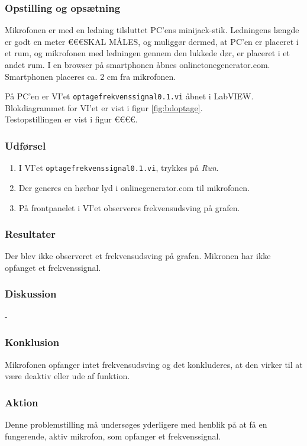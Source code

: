 		\subsubsection{Opstilling og opsætning}
		Mikrofonen er med en ledning tilsluttet PC'ens minijack-stik. Ledningens længde er godt en meter €€€SKAL MÅLES, og muliggør dermed, at PC'en er placeret i et rum, og mikrofonen med ledningen gennem den lukkede dør, er placeret i et andet rum. I en browser på smartphonen åbnes onlinetonegenerator.com. Smartphonen placeres ca. 2 cm fra mikrofonen. 
	
			På PC'en er VI'et \texttt{optagefrekvenssignal0.1.vi} åbnet i LabVIEW. Blokdiagrammet for VI'et er vist i figur \ref{fig:bdoptage}.   \\   
			
			Testopstillingen er vist i figur €€€€.\\ 
	
		\subsubsection{Udførsel}
			\begin{enumerate}
				\item I VI'et \texttt{optagefrekvenssignal0.1.vi}, trykkes på \textit{Run}.  
				\item Der generes en hørbar lyd i onlinegenerator.com til mikrofonen. 
				\item På frontpanelet i VI'et observeres frekvensudsving på grafen.  
			\end{enumerate}
		
		\subsubsection{Resultater}
		Der blev ikke observeret et frekvensudsving på grafen. Mikronen har ikke opfanget et frekvenssignal. 
		\subsubsection{Diskussion} 
		-
		\subsubsection{Konklusion}
		Mikrofonen opfanger intet frekvensudsving og det konkluderes, at den virker til at være deaktiv eller ude af funktion.
		\subsubsection{Aktion}
		Denne problemstilling må undersøges yderligere med henblik på at få en fungerende, aktiv mikrofon, som opfanger et frekvenssignal. 
		
